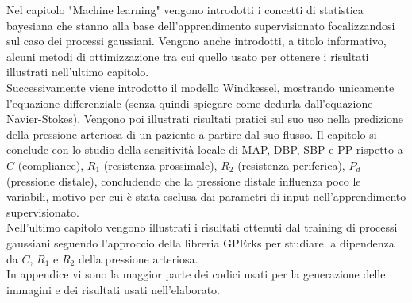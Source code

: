Nel capitolo "Machine learning" vengono introdotti i concetti di statistica bayesiana che stanno alla base dell'apprendimento supervisionato focalizzandosi sul caso dei processi gaussiani. Vengono anche introdotti, a titolo informativo, alcuni metodi di ottimizzazione tra cui quello usato per ottenere i risultati illustrati nell'ultimo capitolo.\\

Successivamente viene introdotto il modello Windkessel, mostrando unicamente l'equazione differenziale (senza quindi spiegare come dedurla dall'equazione Navier-Stokes). Vengono poi illustrati risultati pratici sul suo uso nella predizione della pressione arteriosa di un paziente a partire dal suo flusso. Il capitolo si conclude con lo studio della sensitività locale di MAP, DBP, SBP e PP rispetto a $C$ (compliance), $R_1$ (resistenza prossimale), $R_2$ (resistenza periferica), $P_d$ (pressione distale), concludendo che la pressione distale influenza poco le variabili, motivo per cui è stata esclusa dai parametri di input nell'apprendimento supervisionato. \\

Nell'ultimo capitolo vengono illustrati i risultati ottenuti dal training di processi gaussiani seguendo l'approccio della libreria GPErks per studiare la dipendenza da $C$, $R_1$  e $R_2$ della pressione arteriosa.\\

In appendice vi sono la maggior parte dei codici usati per la generazione delle immagini e dei risultati usati nell'elaborato.